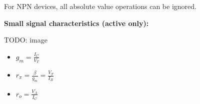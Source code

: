 \documentclass{article}
\begin{document}
For NPN devices, all absolute value operations can be ignored.

\vspace{5mm}
\textbf{Small signal characteristics (active only):}

TODO: image

\vspace{-5mm}
\begin{itemize}
	\item \(g_m = \frac{I_C}{V_T}\)
	\item \(r_{\pi} = \frac{\beta}{g_m} = \frac{V_T}{I_B}\)
	\item \(r_o = \frac{V_A}{I_C}\)
\end{itemize}
\end{document}
